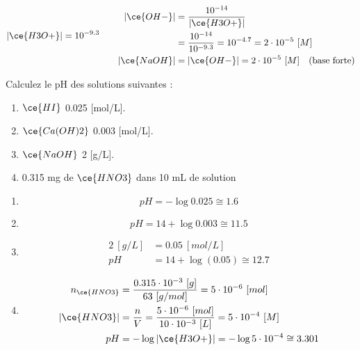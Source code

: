 \documentclass[
  11pt,
  a4paper,
  openany]{book}
\providecommand{\tightlist}{%
  \setlength{\itemsep}{0pt}\setlength{\parskip}{0pt}}
\begin{document}
\begin{Answer}
\[
\begin{split}
|\ce{H3O+}| = 10^{-9.3}
\end{split}
\qquad
\begin{split}
|\ce{OH-}| &= \frac{10^{-14}}{|\ce{H3O+}|} \\
  &= \frac{10^{-14}}{10^{-9.3}} = 10^{-4.7} = 2 \cdot 10^{-5}\ [M] \\
|\ce{NaOH}| &= |\ce{OH-}| = 2 \cdot 10^{-5}\ [M] \quad \text{(base forte)}
\end{split}
\]

\end{Answer}

\clearpage

\begin{Exercise}

Calculez le pH des solutions suivantes :

\begin{enumerate}
\def\labelenumi{\alph{enumi}.}
\tightlist
\item
  \(\ce{HI}\) 0.025 {[}mol/L{]}.
\item
  \(\ce{Ca(OH)2}\) 0.003 {[}mol/L{]}.
\item
  \(\ce{NaOH}\) 2 {[}g/L{]}.
\item
  0.315 mg de \(\ce{HNO3}\) dans 10 mL de solution
\end{enumerate}

\end{Exercise}

\begin{Answer}

\begin{enumerate}
\def\labelenumi{\alph{enumi}.}
\tightlist
\item
  \[
  pH = - \log 0.025 \cong 1.6
  \]
\item
  \[
  pH = 14 + \log 0.003 \cong 11.5
  \]
\item
  \[
  \begin{split}
    2\ [g/L] &= 0.05\ [mol/L] \\
    pH &= 14 + \log(0.05) \cong 12.7
  \end{split}
  \]
\item
  \[
  \begin{split}
    n_{\ce{HNO3}} &= \frac{0.315 \cdot 10^{-3}\ [g]}{63\ [g/mol]} = 5 \cdot 10^{-6}\ [mol] \\
    |\ce{HNO3}| &= \frac{n}{V} = \frac{5 \cdot 10^{-6}\ [mol]}{10 \cdot 10^{-3}\ [L]} = 5 \cdot 10^{-4}\ [M] \\
    pH &= - \log |\ce{H3O+}| = - \log 5 \cdot 10^{-4} \cong 3.301
   \end{split}
  \]
\end{enumerate}

\end{Answer}
\end{document}
